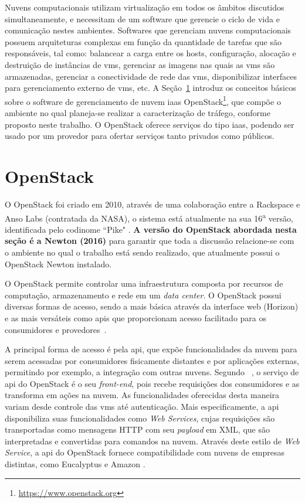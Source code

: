 Nuvens computacionais utilizam virtualização em todos os âmbitos discutidos simultaneamente, e necessitam de um software que gerencie o ciclo de vida e comunicação nestes ambientes.
%
Softwares que gerenciam nuvens computacionais possuem arquiteturas complexas em função da quantidade de tarefas que são responsáveis, tal como: balancear a carga entre os hosts, configuração, alocação e destruição de instâncias de \acp{vm}, gerenciar as imagens nas quais as \acp{vm} são armazenadas, gerenciar a conectividade de rede das \acp{vm}, disponibilizar interfaces para gerenciamento externo de \acp{vm}, etc.
%
A Seção~\ref{cap2:openstack} introduz os conceitos básicos sobre o software de gerenciamento de nuvem \ac{iaas} OpenStack\footnote{\url{https://www.openstack.org}}, que compõe o ambiente no qual planeja-se realizar a caracterização de tráfego, conforme proposto neste trabalho.
%
O OpenStack oferece serviços do tipo \ac{iaas}, podendo ser usado por um provedor para ofertar serviços tanto privados como públicos.

\section{OpenStack}
\label{cap2:openstack}

O OpenStack foi criado em 2010, através de uma colaboração entre a Rackspace e Anso Labs (contratada da NASA), o sistema está atualmente na sua 16\textsuperscript{a} versão, identificada pelo codinome ``Pike" \cite{openstack:about}.
%
\textbf{A versão do OpenStack abordada nesta seção é a Newton (2016)} para garantir que toda a discussão relacione-se com o ambiente no qual o trabalho está sendo realizado, que atualmente possui o OpenStack Newton instalado. 

O OpenStack permite controlar uma infraestrutura composta por recursos de computação, armazenamento e rede em um \textit{data center}.
%
O OpenStack possui diversas formas de acesso, sendo a mais básica através da interface web (Horizon) e as mais versáteis como \acp{api} que proporcionam acesso facilitado para os consumidores e provedores~\cite{openstack:about}. 

A principal forma de acesso é pela \ac{api}, que expõe funcionalidades da nuvem para serem acessadas por consumidores fisicamente distantes e por aplicações externas, permitindo por exemplo, a integração com outras nuvens.
%
Segundo ~, o serviço de \ac{api} do OpenStack é o seu \textit{front-end}, pois recebe requisições dos consumidores e as transforma em ações na nuvem.
%
As funcionalidades oferecidas desta maneira variam desde controle das \acp{vm} até autenticação.
%
Mais especificamente, a \ac{api} disponibiliza suas funcionalidades como \textit{Web Services}, cujas requisições são transportadas como mensagens HTTP com seu \textit{payload} em XML, que são interpretadas e convertidas para comandos na nuvem.
%
Através deste estilo de \textit{Web Service}, a \ac{api} do OpenStack fornece compatibilidade com nuvens de empresas distintas, como Eucalyptus e Amazon \cite{corradi:2014:openstackConsolidation}.



